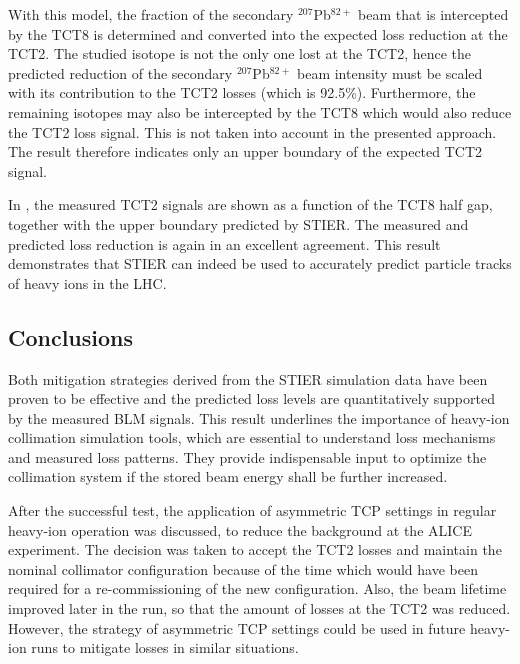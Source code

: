 With this model, the fraction of the secondary $^{207}$Pb$^{82+}$ beam that is intercepted by the TCT8 is determined and converted into the expected loss reduction at the TCT2. The studied isotope is not the only one lost at the TCT2, hence the predicted reduction of the secondary $^{207}$Pb$^{82+}$ beam intensity must be scaled with its contribution to the TCT2 losses (which is 92.5\%). Furthermore, the remaining isotopes may also be intercepted by the TCT8 which would also reduce the TCT2 loss signal. This is not taken into account in the presented approach. The result therefore indicates only an upper boundary of the expected TCT2 signal. 


In , the measured TCT2 signals are shown as a function of the TCT8 half gap, together with the upper boundary predicted by STIER. The measured and predicted loss reduction is again in an excellent agreement. This result demonstrates that STIER can indeed be used to accurately predict particle tracks of heavy ions in the LHC. 



\subsection{Conclusions}

Both mitigation strategies derived from the STIER simulation data have been proven to be effective and the predicted loss levels are quantitatively supported by the measured BLM signals. This result underlines the importance of heavy-ion collimation simulation tools, which are essential to understand loss mechanisms and measured loss patterns. They provide indispensable input to optimize the collimation system if the stored beam energy shall be further increased. 

\vspace{0.2cm}

After the successful test, the application of asymmetric TCP settings in regular heavy-ion operation was discussed, to reduce the background at the ALICE experiment. The decision was taken to accept the TCT2 losses and maintain the nominal collimator configuration because of the time which would have been required for a re-commissioning of the new configuration. Also, the beam lifetime improved later in the run, so that the amount of losses at the TCT2 was reduced. However, the strategy of asymmetric TCP settings could be used in future heavy-ion runs to mitigate losses in similar situations.



